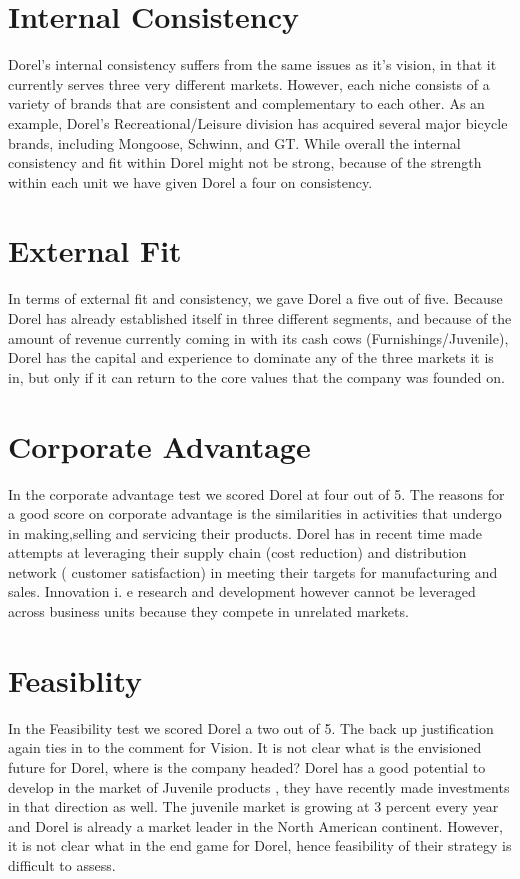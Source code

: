 {\section{Internal Consistency}
Dorel’s internal consistency suffers from the same issues as it’s vision, in that it currently serves three very different markets.  However, each niche consists of a variety of brands that are consistent and complementary to each other.  As an example, Dorel’s Recreational/Leisure division has acquired several major bicycle brands, including Mongoose, Schwinn, and GT.  While overall the internal consistency and fit within Dorel might not be strong, because of the strength within each unit we have given Dorel a four on consistency.

\section{External Fit}
In terms of  external fit and consistency, we gave Dorel a five out of five.  Because Dorel has already established itself in three different segments, and because of the amount of revenue currently coming in with its cash cows (Furnishings/Juvenile), Dorel has the capital and experience to dominate any of the three markets it is in, but only if it can return to the core values that the company was founded on.

\section{Corporate Advantage}
In the corporate advantage test we scored Dorel at four out of 5. The reasons for a good score on corporate advantage is the similarities in activities that undergo in making,selling and servicing their products. Dorel has in recent time made attempts at leveraging their supply chain (cost reduction) and distribution network ( customer satisfaction) in meeting their targets for manufacturing and sales. Innovation i. e  research and development however cannot be leveraged across business units because they compete in unrelated markets.

\section{Feasiblity}
In the Feasibility test we scored Dorel a two out of 5. The back up justification again ties in to the comment for Vision. It is not clear what is the envisioned future for Dorel, where is the company headed? Dorel has a good potential to develop in the market of Juvenile products , they have recently made investments in that direction as well. The juvenile market is growing at 3 percent every year and Dorel is already a market leader in the North American continent. However, it is not clear what in the end game for Dorel, hence feasibility of their strategy is difficult to assess.

}
